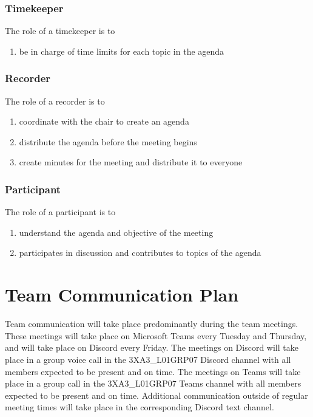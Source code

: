 \documentclass[12pt,letterpaper]{article}
\begin{document}
\subsubsection{Timekeeper}
The role of a timekeeper is to
\begin{enumerate}
    \item be in charge of time limits for each topic in the agenda
\end{enumerate}

\subsubsection{Recorder}
The role of a recorder is to 
\begin{enumerate}
    \item coordinate with the chair to create an agenda
    \item distribute the agenda before the meeting begins
    \item create minutes for the meeting and distribute it to everyone
\end{enumerate}

\subsubsection{Participant}
The role of a participant is to 
\begin{enumerate}
    \item understand the agenda and objective of the meeting
    \item participates in discussion and contributes to topics of the agenda
\end{enumerate}

\section{Team Communication Plan}

Team communication will take place predominantly during the team meetings. These meetings will take place on Microsoft Teams every Tuesday and Thursday, and will take place on Discord every Friday. The meetings on Discord will take place in a group voice call in the 3XA3\_L01GRP07 Discord channel with all members expected to be present and on time. The meetings on Teams will take place in a group call in the 3XA3\_L01GRP07 Teams channel with all members expected to be present and on time. Additional communication outside of regular meeting times will take place in the corresponding Discord text channel.
\end{document}
